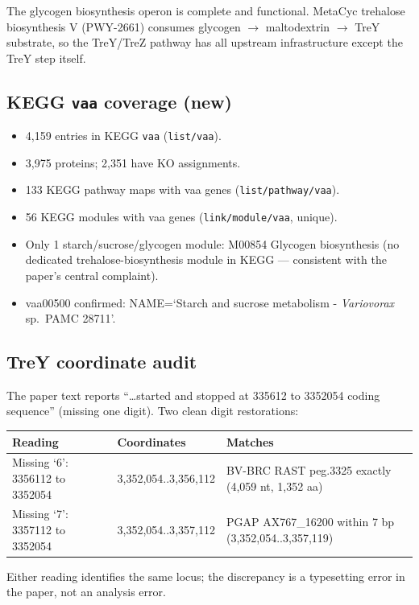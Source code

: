 \documentclass[11pt,letterpaper]{article}
\begin{document}
\noindent The glycogen biosynthesis operon is complete and functional. MetaCyc trehalose
biosynthesis V (PWY-2661) consumes glycogen $\to$ maltodextrin $\to$ TreY substrate, so the
TreY/TreZ pathway has all upstream infrastructure except the TreY step itself.

\subsection{KEGG \texttt{vaa} coverage (new)}
\begin{itemize}[leftmargin=1.2em,itemsep=1pt]
  \item 4{,}159 entries in KEGG \texttt{vaa} (\texttt{list/vaa}).
  \item 3{,}975 proteins; 2{,}351 have KO assignments.
  \item 133 KEGG pathway maps with vaa genes (\texttt{list/pathway/vaa}).
  \item 56 KEGG modules with vaa genes (\texttt{link/module/vaa}, unique).
  \item Only 1 starch/sucrose/glycogen module: M00854 Glycogen biosynthesis (no dedicated trehalose-biosynthesis module in KEGG --- consistent with the paper's central complaint).
  \item vaa00500 confirmed: NAME=`Starch and sucrose metabolism - \textit{Variovorax} sp.\ PAMC 28711'.
\end{itemize}

\subsection{TreY coordinate audit}
The paper text reports ``\ldots started and stopped at 335612 to 3352054 coding sequence'' (missing one digit). Two clean digit restorations:
\begin{tabularx}{\linewidth}{@{}l l X@{}}
\toprule
Reading & Coordinates & Matches \\
\midrule
Missing `6': 3356112 to 3352054 & 3{,}352{,}054..3{,}356{,}112 & BV-BRC RAST peg.3325 exactly (4{,}059 nt, 1{,}352 aa) \\
Missing `7': 3357112 to 3352054 & 3{,}352{,}054..3{,}357{,}112 & PGAP AX767\_16200 within 7 bp (3{,}352{,}054..3{,}357{,}119) \\
\bottomrule
\end{tabularx}
Either reading identifies the same locus; the discrepancy is a typesetting error in the paper, not an analysis error.
\end{document}
